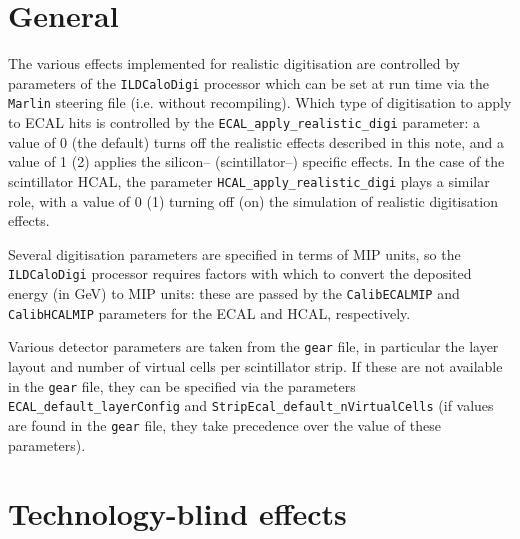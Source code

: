 \documentclass[12pt]{article} %
\begin{document}
\section{General}

The various effects implemented for realistic digitisation are controlled by parameters of the {\tt ILDCaloDigi}
processor which can be set at run time via the {\tt Marlin} steering file (i.e. without recompiling).
Which type of digitisation to apply to ECAL hits is controlled by the {\tt ECAL\_apply\_realistic\_digi} parameter: a value of
0 (the default) turns off the realistic effects described in this note, and a value of 1 (2) applies the silicon--
(scintillator--) specific effects. In the case of the scintillator HCAL, the parameter {\tt HCAL\_apply\_realistic\_digi}
plays a similar role, with a value of 0 (1) turning off (on) the simulation of realistic digitisation effects.

Several digitisation parameters are specified in terms of MIP units, so the {\tt ILDCaloDigi} processor requires 
factors with which to convert the deposited energy (in GeV) to MIP units: these are passed by the {\tt CalibECALMIP} and 
{\tt CalibHCALMIP} parameters for the ECAL and HCAL, respectively.

Various detector parameters are taken from the {\tt gear} file, in particular the layer layout and number of virtual 
cells per scintillator strip. If these are not available in the {\tt gear} file, they can be specified via the
parameters {\tt ECAL\_default\_layerConfig} and {\tt StripEcal\_default\_nVirtualCells} (if values are found in the 
{\tt gear} file, they take precedence over the value of these parameters).

\section{Technology-blind effects}
\label{sec:common}
\end{document}
